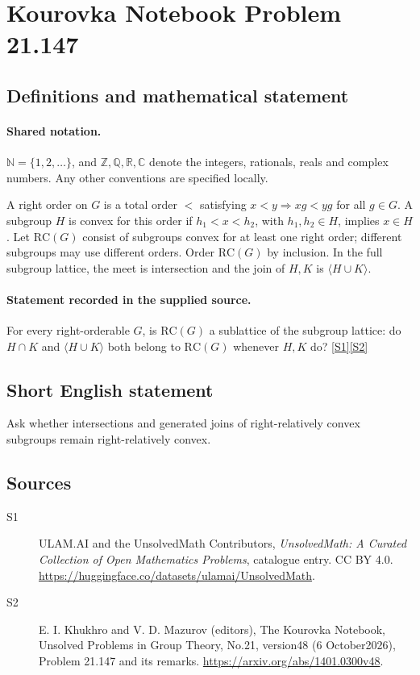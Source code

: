 \documentclass[11pt]{article}
\newcommand{\sref}[2]{\hyperlink{source:#1:#2}{[S#2]}}
\begin{document}
\section{Kourovka Notebook Problem 21.147}\label{statement}

\subsection{Definitions and mathematical statement}

\paragraph{Shared notation.}$\mathbb N=\{1,2,\ldots\}$, and $\mathbb Z,\mathbb Q,\mathbb R,\mathbb C$ denote the integers, rationals, reals and complex numbers. Any other conventions are specified locally.


A right order on $G$ is a total order $<$ satisfying $x<y\Rightarrow xg<yg$ for all $g\in G$. A subgroup $H$ is convex for this order if $h_1<x<h_2$, with $h_1,h_2\in H$, implies $x\in H$. Let $\mathrm{RC}(G)$ consist of subgroups convex for at least one right order; different subgroups may use different orders. Order $\mathrm{RC}(G)$ by inclusion. In the full subgroup lattice, the meet is intersection and the join of $H,K$ is $\langle H\cup K\rangle$.
\paragraph{Statement recorded in the supplied source.}
For every right-orderable $G$, is $\mathrm{RC}(G)$ a sublattice of the subgroup lattice: do $H\cap K$ and $\langle H\cup K\rangle$ both belong to $\mathrm{RC}(G)$ whenever $H,K$ do? \sref{statement}{1}\sref{statement}{2}
\subsection{Short English statement}
Ask whether intersections and generated joins of right-relatively convex subgroups remain right-relatively convex.
\subsection{Sources}
\begin{description}
\item[\hypertarget{source:statement:1}{S1}] ULAM.AI and the UnsolvedMath Contributors, \emph{UnsolvedMath: A Curated Collection of Open Mathematics Problems}, catalogue entry. CC BY 4.0. \url{https://huggingface.co/datasets/ulamai/UnsolvedMath}.
\item[\hypertarget{source:statement:2}{S2}] E. I. Khukhro and V. D. Mazurov (editors), The Kourovka Notebook, Unsolved Problems in Group Theory, No.21, version48 (6 October2026), Problem 21.147 and its remarks. \url{https://arxiv.org/abs/1401.0300v48}.
\end{description}
\label{end:statement}
\end{document}

